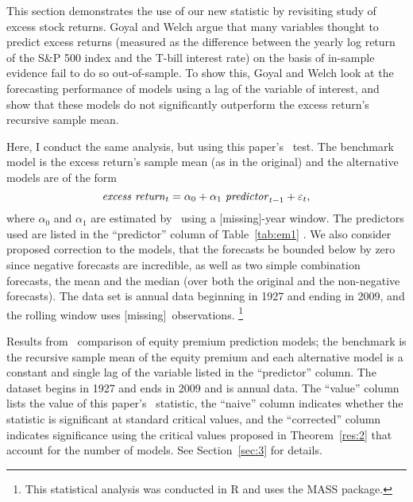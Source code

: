 \documentclass[12pt,fleqn]{article}
\providecommand\windowlength{[missing]}
\providecommand\empiricaltable{[missing]}
\begin{document}
This section demonstrates the use of our new statistic by revisiting
 study of excess stock returns.  Goyal and Welch argue
that many variables thought to predict excess returns (measured as the
difference between the yearly log return of the S\&P 500 index and the
T-bill interest rate) on the basis of in-sample evidence fail to do so
out-of-sample.  To show this, Goyal and Welch look at the forecasting
performance of models using a lag of the variable of interest, and
show that these models do not significantly outperform the excess
return's recursive sample mean.

Here, I conduct the same analysis, but using this paper's \mds\ test.
The benchmark model is the excess return's sample mean (as in the
original) and the alternative models are of the form
\begin{equation*}
  \mathit{excess~return}_{t} = \alpha_{0} + \alpha_{1}\
  \mathit{predictor}_{t-1} + \varepsilon_{t},
\end{equation*}
where $\alpha_{0}$ and
$\alpha_{1}$ are estimated by \ols\ using a \windowlength-year window.
The predictors used are listed in the ``predictor'' column of
Table~\ref{tab:em1} \citep[see][for a detailed description of the
variables]{GoW:08}.  We also consider \citepos{CaT:08} proposed
correction to the models, that the forecasts be bounded below by zero
since negative forecasts are incredible, as well as two simple
combination forecasts, the mean and the median (over both the original
and the non-negative forecasts).  The data set is annual data
beginning in 1927 and ending in 2009, and the rolling window uses
\windowlength\ observations.%
\footnote{This statistical analysis was conducted in R \citep{R} and
  uses the MASS \citep[7.3-22]{VeR:02} package.} %

\begin{table}[tb!]
  \centering
  \empiricaltable
\caption{Results from \oos\ comparison of equity premium prediction
  models; the benchmark is the recursive sample mean of the equity
  premium and each alternative model is a constant and single lag of
  the variable listed in the ``predictor'' column.  The dataset begins
  in 1927 and ends in 2009 and is annual data. The ``value'' column
  lists the value of this paper's \oos\ statistic, the ``naive''
  column indicates whether the statistic is significant at standard
  critical values, and the ``corrected'' column indicates significance
  using the critical values proposed in Theorem~\ref{res:2} that
  account for the number of models.  See Section~\ref{sec:3} for details.}
\label{tab:em1}
\end{table}
\end{document}
